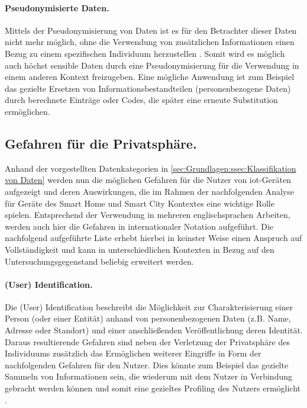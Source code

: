 \paragraph{Pseudonymisierte Daten.}
\label{sec:Grundlagen:para:Pseudonymisierte Daten}
Mittels der Pseudonymisierung von Daten ist es für den Betrachter dieser Daten nicht mehr möglich, ohne die Verwendung von zusätzlichen Informationen einen Bezug zu einem spezifischen Individuum herzustellen \cite{DSGVOArt4}. 
Somit wird es möglich auch höchst sensible Daten durch eine Pseudonymisierung für die Verwendung in einem anderen Kontext freizugeben. Eine mögliche Anwendung ist zum Beispiel das gezielte Ersetzen von Informationsbestandteilen (personenbezogene Daten) durch berechnete Einträge oder Codes, die später eine erneute Substitution ermöglichen.

\subsection{Gefahren für die Privatsphäre.}
\label{sec:Grundlagen:ssec:Gefahren für die Privatsphäre}

Anhand der vorgestellten Datenkategorien in \ref{sec:Grundlagen:ssec:Klassifikation von Daten} werden nun die möglichen Gefahren für die Nutzer von \ac{iot}-Geräten aufgezeigt und deren Auswirkungen, die im Rahmen der nachfolgenden Analyse für Geräte des Smart Home und Smart City Kontextes eine wichtige Rolle spielen. Entsprechend der Verwendung in mehreren englischsprachen Arbeiten, werden auch hier die Gefahren in internationaler Notation aufgeführt. 
Die nachfolgend aufgeführte Liste erhebt hierbei in keinster Weise einen Anspruch auf Vollständigkeit und kann in unterschiedlichen Kontexten in Bezug auf den Untersuchungsgegenstand beliebig erweitert werden.

\paragraph{(User) Identification.}
\label{sec:Grundlagen:para:User Identification}
Die (User) Identification beschreibt die Möglichkeit zur Charakterisierung einer Person (oder einer Entität) anhand von personenbezogenen Daten (z.B. Name, Adresse oder Standort) und einer anschließenden Veröffentlichung deren Identität. Daraus resultierende Gefahren sind neben der Verletzung der Privatsphäre des Individuums zusätzlich das Ermöglichen weiterer Eingriffe in Form der nachfolgenden Gefahren für den Nutzer. Dies könnte zum Beispiel das gezielte Sammeln von Informationen sein, die wiederum mit dem Nutzer in Verbindung gebracht werden können und somit eine gezieltes Profiling des Nutzers ermöglicht \cite{Seliem2018}.

